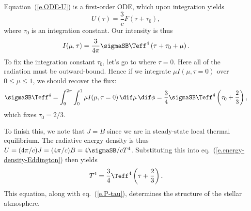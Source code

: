 Equation~(\ref{e.ODE-U}) is a first-order ODE, which upon integration yields
\begin{equation}\label{e.energy-density-Eddington}
	U(\tau) = \frac{3}{c}F(\tau + \tau_{0}),
\end{equation}
where $\tau_{0}$ is an integration constant. Our intensity is thus
\[
	I(\mu,\tau) = \frac{3}{4\pi}\sigmaSB\Teff^{4}\left(\tau + \tau_{0} + \mu\right).
\]
To fix the integration constant $\tau_{0}$, let's go to where $\tau=0$. Here all of the radiation must be outward-bound. Hence if we integrate $\mu I(\mu,\tau=0)$ over $0\le\mu\le 1$, we should recover the flux:
\[
	\sigmaSB\Teff^{4} = \int_{0}^{2\pi}\int_{0}^{1} \mu I(\mu,\tau=0)\,\dif\mu\,\dif\phi
	= \frac{3}{4}\sigmaSB\Teff^{4}\left(\tau_{0} + \frac{2}{3}\right),
\]
which fixes $\tau_{0} = 2/3$.

To finish this, we note that $J = B$ since we are in steady-state local thermal equilibrium. The radiative energy density is thus $U = (4\pi/c) J = (4\pi/c)B = 4\sigmaSB/c T^{4}$. Substituting this into eq.~(\ref{e.energy-density-Eddington}) then yields
\begin{equation}\label{e.T-tau}
T^{4} = \frac{3}{4}\Teff^{4}\left(\tau + \frac{2}{3}\right).
\end{equation}
This equation, along with eq.~(\ref{e.P-tau}), determines the structure of the stellar atmosphere.

